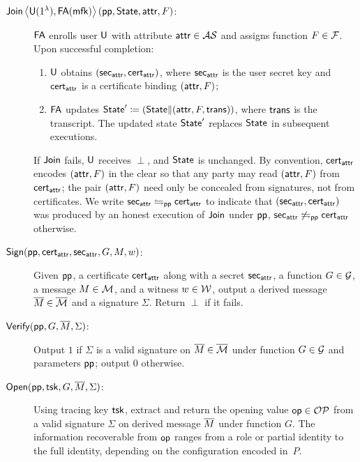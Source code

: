 \begin{definition}[\SMS]
\begin{description}
\item[$\mathsf{Join}\left\langle \mathsf{U}(1^\lambda),\mathsf{FA}(\mathsf{mfk})\right\rangle(\mathsf{pp}, \mathsf{State}, \mathsf{attr}, F)$:]
$\mathsf{FA}$ enrolls user $\mathsf{U}$ with attribute $\mathsf{attr} \in \mathcal{AS}$
and assigns function $F \in \mathcal{F}$.
Upon successful completion:
\begin{enumerate}
\item $\mathsf{U}$ obtains $(\mathsf{sec}_{\mathsf{attr}}, \mathsf{cert}_{\mathsf{attr}})$,
where $\mathsf{sec}_{\mathsf{attr}}$ is the user secret key and
$\mathsf{cert}_{\mathsf{attr}}$ is a certificate binding $(\mathsf{attr}, F)$;
\item $\mathsf{FA}$ updates $\mathsf{State}' \coloneqq (\mathsf{State} \| (\mathsf{attr}, F, \mathsf{trans}))$, 
where $\mathsf{trans}$ is the transcript.
The updated state $\mathsf{State}'$ replaces $\mathsf{State}$ in subsequent executions.
\end{enumerate}
If $\mathsf{Join}$ fails, $\mathsf{U}$ receives $\perp$, and $\mathsf{State}$ is unchanged.
By convention, $\mathsf{cert}_{\mathsf{attr}}$ encodes $(\mathsf{attr}, F)$ in the clear so that
any party may read $(\mathsf{attr}, F)$ from $\mathsf{cert}_{\mathsf{attr}}$;
the pair $(\mathsf{attr}, F)$ need only be concealed from signatures, not from certificates.
We write $\mathsf{sec}_{\mathsf{attr}} \leftrightharpoons_{\mathsf{pp}} \mathsf{cert}_{\mathsf{attr}}$ to indicate that
$(\mathsf{sec}_{\mathsf{attr}}, \mathsf{cert}_{\mathsf{attr}})$ was produced by an honest execution of $\mathsf{Join}$
under $\mathsf{pp}$, 
$\mathsf{sec}_{\mathsf{attr}} \not\leftrightharpoons_{\mathsf{pp}} \mathsf{cert}_{\mathsf{attr}}$ otherwise.


\item[$\mathsf{Sign}(\mathsf{pp}, \mathsf{cert}_{\mathsf{attr}}, \mathsf{sec}_{\mathsf{attr}}, G, M, w)$:]
Given $\mathsf{pp}$, a certificate $\mathsf{cert}_{\mathsf{attr}}$ along with a secret $\mathsf{sec}_{\mathsf{attr}}$,
a function $G \in \mathcal{G}$, a message $M \in \mathcal{M}$,
and a witness $w \in \mathcal{W}$,
output a derived message $\overline{M} \in \overline{\mathcal{M}}$ and a signature $\Sigma$.
Return $\perp$ if it fails.

\item[$\mathsf{Verify}(\mathsf{pp}, G, \overline{M}, \Sigma)$:]
Output $1$ if $\Sigma$ is a valid \SMS signature on $\overline{M} \in \overline{\mathcal{M}}$
under function $G \in \mathcal{G}$ and parameters $\mathsf{pp}$;
output $0$ otherwise.

\item[$\mathsf{Open}(\mathsf{pp}, \mathsf{tsk}, G, \overline{M}, \Sigma)$:]
Using tracing key $\mathsf{tsk}$, extract and return the opening value $\mathsf{op} \in \mathcal{OP}$
from a valid signature $\Sigma$ on derived message $\overline{M}$ under function $G$.
The information recoverable from $\mathsf{op}$ ranges from a role or partial identity
to the full identity, depending on the configuration encoded in~$P$.

\end{description}
\end{definition}

